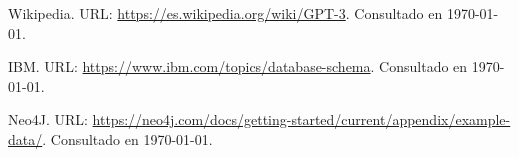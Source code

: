\documentclass[a4paper,10pt,twocolumn]{article}
\begin{document}
\begin{thebibliography}{99}
	 Wikipedia. URL: \href{https://es.wikipedia.org/wiki/GPT-3}
	  {https://es.wikipedia.org/wiki/GPT-3}.
		Consultado en \today.

	 IBM. URL: \href{https://www.ibm.com/topics/database-schema}
	  {https://www.ibm.com/topics/database-schema}.
		Consultado en \today.

		 Neo4J. URL: \href{https://neo4j.com/docs/getting-started/current/appendix/example-data/}
	  {https://neo4j.com/docs/getting-started/current/appendix/example-data/}.
		Consultado en \today.

\end{thebibliography}

\end{document}
